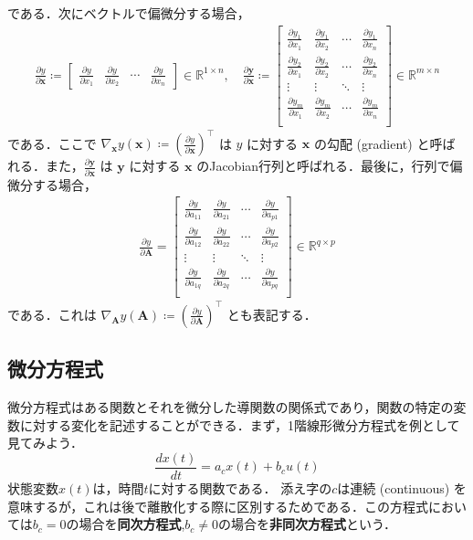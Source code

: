 である．次にベクトルで偏微分する場合，
\begin{align}
\frac{\partial y}{\partial \mathbf{x}}\coloneqq 
\begin{bmatrix}
\frac{\partial y}{\partial x_{1}}&\frac{\partial y}{\partial x_{2}}&\cdots &\frac{\partial y}{\partial x_{n}}
\end{bmatrix}
\in \mathbb{R}^{1\times n}, \quad
\frac{\partial \mathbf{y}}{\partial \mathbf{x}}\coloneqq 
\begin{bmatrix}
\frac{\partial y_{1}}{\partial x_{1}}&\frac{\partial y_{1}}{\partial x_{2}}&\cdots &\frac{\partial y_{1}}{\partial x_{n}}\\
\frac{\partial y_{2}}{\partial x_{1}}&\frac{\partial y_{2}}{\partial x_{2}}&\cdots &\frac{\partial y_{2}}{\partial x_{n}}\\
\vdots &\vdots &\ddots &\vdots\\
\frac{\partial y_{m}}{\partial x_{1}}&\frac{\partial y_{m}}{\partial x_{2}}&\cdots &\frac{\partial y_{m}}{\partial x_{n}}\\
\end{bmatrix}
\in \mathbb{R}^{m \times n}
\end{align}
である．ここで $\nabla_\mathbf{x} y(\mathbf{x})\coloneqq \left(\frac{\partial y}{\partial \mathbf{x}}\right)^\top$ は $y$ に対する $\mathbf{x}$ の勾配 (gradient) と呼ばれる．また，$\frac{\partial \mathbf{y}}{\partial \mathbf{x}}$ は $\mathbf{y}$ に対する $\mathbf{x}$ のJacobian行列と呼ばれる．最後に，行列で偏微分する場合，
\begin{align}
\frac{\partial y}{\partial \mathbf{A}}=
\begin{bmatrix}
\frac{\partial y}{\partial a_{11}}&\frac{\partial y}{\partial a_{21}}&\cdots &{\frac{\partial y}{\partial a_{p1}}}\\
\frac{\partial y}{\partial a_{12}}&\frac{\partial y}{\partial a_{22}}&\cdots &{\frac{\partial y}{\partial a_{p2}}}\\
\vdots &\vdots &\ddots &\vdots \\
\frac{\partial y}{\partial a_{1q}}&\frac{\partial y}{\partial a_{2q}}&\cdots &{\frac{\partial y}{\partial a_{pq}}}\\
\end{bmatrix}
\in \mathbb{R}^{q \times p}
\end{align}
である．これは $\nabla_\mathbf{A} y(\mathbf{A})\coloneqq  (\frac{\partial y}{\partial \mathbf{A}})^\top$ とも表記する．
\subsection{微分方程式}
微分方程式はある関数とそれを微分した導関数の関係式であり，関数の特定の変数に対する変化を記述することができる．まず，1階線形微分方程式を例として見てみよう．
\begin{equation}
\frac{dx(t)}{dt}=a_c x(t)+b_c u(t)
\end{equation}
状態変数$x(t)$は，時間$t$に対する関数である．
添え字の$c$は連続 (continuous) を意味するが，これは後で離散化する際に区別するためである．この方程式においては$b_c=0$の場合を\textbf{同次方程式},$b_c\neq 0$の場合を\textbf{非同次方程式}という．
